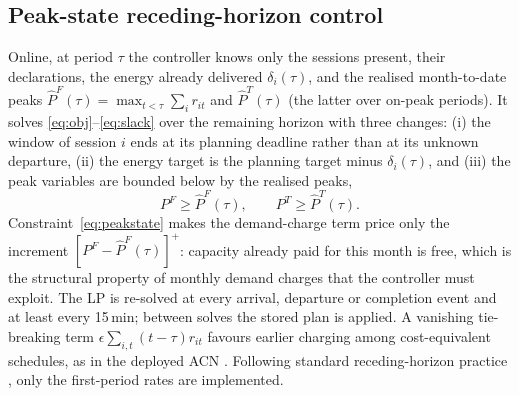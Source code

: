 \subsection{Peak-state receding-horizon control}
Online, at period $\tau$ the controller knows only the sessions present, their declarations, the energy already delivered $\delta_i(\tau)$, and the realised month-to-date peaks $\hat P^F(\tau)=\max_{t<\tau}\sum_i r_{it}$ and $\hat P^T(\tau)$ (the latter over on-peak periods). It solves \eqref{eq:obj}--\eqref{eq:slack} over the remaining horizon with three changes: (i) the window of session $i$ ends at its planning deadline rather than at its unknown departure, (ii) the energy target is the planning target minus $\delta_i(\tau)$, and (iii) the peak variables are bounded below by the realised peaks,
\begin{equation}
P^F\ge \hat P^F(\tau),\qquad P^T\ge \hat P^T(\tau). \label{eq:peakstate}
\end{equation}
Constraint~\eqref{eq:peakstate} makes the demand-charge term price only the increment $[P^F-\hat P^F(\tau)]^+$: capacity already paid for this month is free, which is the structural property of monthly demand charges that the controller must exploit. The LP is re-solved at every arrival, departure or completion event and at least every 15\,min; between solves the stored plan is applied. A vanishing tie-breaking term $\epsilon\sum_{i,t}(t-\tau)r_{it}$ favours earlier charging among cost-equivalent schedules, as in the deployed ACN \cite{Lee2019ACNData}. Following standard receding-horizon practice \cite{Mayne2014MPC}, only the first-period rates are implemented.

